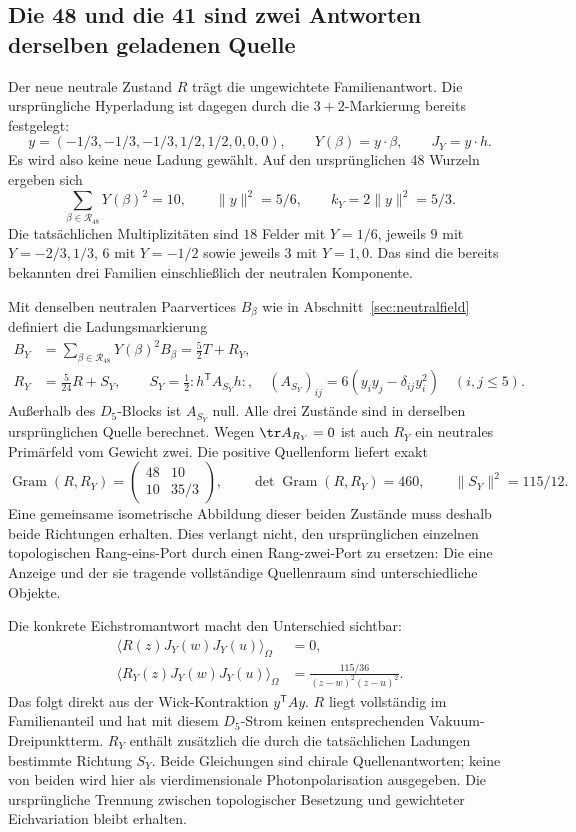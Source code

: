 \subsection{Die 48 und die 41 sind zwei Antworten derselben geladenen Quelle}\label{sec:chargeweightedsource}
Der neue neutrale Zustand $R$ trägt die ungewichtete Familienantwort.
Die ursprüngliche Hyperladung ist dagegen durch die $3+2$-Markierung bereits festgelegt:
\[
y=(-1/3,-1/3,-1/3,1/2,1/2,0,0,0),\qquad
Y(\beta)=y\cdot\beta,\qquad J_Y=y\cdot h.
\]
Es wird also keine neue Ladung gewählt. Auf den ursprünglichen 48 Wurzeln ergeben sich
\[
\sum_{\beta\in\mathcal R_{48}}Y(\beta)^2=10,
\qquad \|y\|^2=5/6,\qquad k_Y=2\|y\|^2=5/3.
\]
Die tatsächlichen Multiplizitäten sind $18$ Felder mit $Y=1/6$, jeweils
$9$ mit $Y=-2/3,1/3$, $6$ mit $Y=-1/2$ sowie jeweils $3$ mit $Y=1,0$.
Das sind die bereits bekannten drei Familien einschließlich der neutralen Komponente.

Mit denselben neutralen Paarvertices $B_\beta$ wie in Abschnitt~\ref{sec:neutralfield} definiert die Ladungsmarkierung
\begin{align}
 B_Y&=\sum_{\beta\in\mathcal R_{48}}Y(\beta)^2B_\beta
     =\frac52 T+R_Y,\\
 R_Y&=\frac5{24}R+S_Y,\qquad
 S_Y=\frac12:h^{\mathsf T}A_{S_Y}h:,
 \quad (A_{S_Y})_{ij}=6(y_i y_j-\delta_{ij}y_i^2)\quad(i,j\leq5).
\end{align}
Außerhalb des $D_5$-Blocks ist $A_{S_Y}$ null. Alle drei Zustände sind in derselben
ursprünglichen Quelle berechnet. Wegen $\tr A_{R_Y}=0$ ist auch $R_Y$ ein neutrales
Primärfeld vom Gewicht zwei. Die positive Quellenform liefert exakt
\begin{equation}\label{eq:neutralchargegram}
\operatorname{Gram}(R,R_Y)=
\begin{pmatrix}48&10\\10&35/3\end{pmatrix},\qquad
\det\operatorname{Gram}(R,R_Y)=460,\qquad \|S_Y\|^2=115/12.
\end{equation}
Eine gemeinsame isometrische Abbildung dieser beiden Zustände muss deshalb beide
Richtungen erhalten. Dies verlangt nicht, den ursprünglichen einzelnen topologischen
Rang-eins-Port durch einen Rang-zwei-Port zu ersetzen: Die eine Anzeige und der sie
tragende vollständige Quellenraum sind unterschiedliche Objekte.

Die konkrete Eichstromantwort macht den Unterschied sichtbar:
\begin{align}
 \langle R(z)J_Y(w)J_Y(u)\rangle_\Omega&=0,\\
 \langle R_Y(z)J_Y(w)J_Y(u)\rangle_\Omega
 &=\frac{115/36}{(z-w)^2(z-u)^2}.
\end{align}
Das folgt direkt aus der Wick-Kontraktion $y^{\mathsf T}A y$. $R$ liegt vollständig
im Familienanteil und hat mit diesem $D_5$-Strom keinen entsprechenden Vakuum-Dreipunktterm.
$R_Y$ enthält zusätzlich die durch die tatsächlichen Ladungen bestimmte Richtung $S_Y$.
Beide Gleichungen sind chirale Quellenantworten; keine von beiden wird hier als
vierdimensionale Photonpolarisation ausgegeben. Die ursprüngliche Trennung zwischen
topologischer Besetzung und gewichteter Eichvariation bleibt erhalten.

